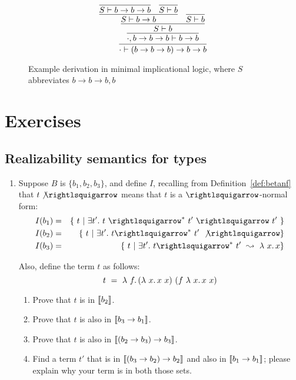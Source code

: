 \begin{figure}
  \[
  \infer{\cdot \vdash  (b \to b \to b) \to b \to b}
        {\infer{\cdot,b \to b \to b \vdash b \to b}
          {\infer{S \vdash b}
            {\infer{S \vdash b \to b}
              {\infer{S \vdash b \to b \to b}{\ }
              & \infer{S \vdash b}{\ }}
            &\infer{S \vdash b}{\ }}}}
  \]
\caption{Example derivation in minimal implicational logic, where $S$ abbreviates $b \to b \to b, b$}
\label{fig:minimplex}
\end{figure}


\section{Exercises}

\subsection{Realizability semantics for types}

\begin{enumerate}
  
\item Suppose $B$ is $\{ b_1, b_2, b_3\}$, and define $I$, recalling
  from Definition~\ref{def:betanf} that $t\not\betaa$ means that $t$
  is a $\betaa$-normal form:
\begin{eqnarray*}
I(b_1) & = & \{\ t\ |\ \exists t'.\ t\ \betaa^*\ t'\ \betaa\ t'\ \} \\
I(b_2) & = & \{\ t\ |\ \exists t'.\ t \betaa^*\ t'\ \not\betaa \} \\
I(b_3) & = & \{\ t\ |\ \exists t'.\ t \betaa^*\ t'\ \leadsto\ \lam{x}{x} \} \\
\end{eqnarray*}

\noindent Also, define the term $t$ as follows:
\[
t\ =\ \lam{f}{(\lam{x}{x\ x})\ (f\ \lam{x}{x\ x})}
\]

\begin{enumerate}

\item Prove that $t$ is in $\llbracket b_2 \rrbracket$.

\item Prove that $t$ is also in $\llbracket b_3 \to b_1 \rrbracket$.

\item Prove that $t$ is also in $\llbracket (b_2 \to b_3)\to b_3 \rrbracket$.

\item Find a term $t'$ that is in $\llbracket (b_3 \to b_2) \to b_2 \rrbracket$
  and also in $\llbracket b_1 \to b_1 \rrbracket$; please explain why your term is in both those sets. 

\end{enumerate}
\end{enumerate}
 
